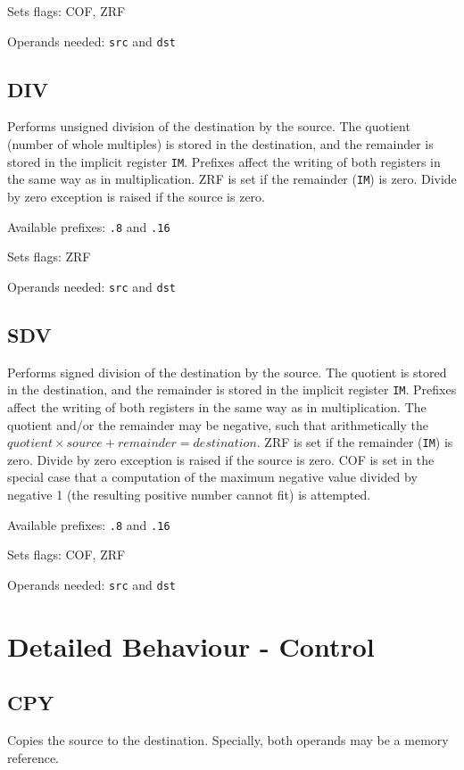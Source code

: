 \documentclass[12pt,a4paper]{report}
\begin{document}
Sets flags: COF, ZRF

Operands needed: \texttt{src} and \texttt{dst}

\subsection*{DIV}
Performs unsigned division of the destination by the source. The quotient (number of whole multiples) is stored in the destination, and the remainder is stored in the implicit register \texttt{IM}. Prefixes affect the writing of both registers in the same way as in multiplication. ZRF is set if the remainder (\texttt{IM}) is zero. Divide by zero exception is raised if the source is zero.

Available prefixes: \texttt{.8} and \texttt{.16}

Sets flags: ZRF

Operands needed: \texttt{src} and \texttt{dst}

\subsection*{SDV}
Performs signed division of the destination by the source. The quotient is stored in the destination, and the remainder is stored in the implicit register \texttt{IM}. Prefixes affect the writing of both registers in the same way as in multiplication. The quotient and/or the remainder may be negative, such that arithmetically the $quotient \times source + remainder = destination$. ZRF is set if the remainder (\texttt{IM}) is zero. Divide by zero exception is raised if the source is zero. COF is set in the special case that a computation of the maximum negative value divided by negative 1 (the resulting positive number cannot fit) is attempted.

Available prefixes: \texttt{.8} and \texttt{.16}

Sets flags: COF, ZRF

Operands needed: \texttt{src} and \texttt{dst}

\section{Detailed Behaviour - Control}

\subsection*{CPY}
Copies the source to the destination. Specially, both operands may be a memory reference.
\end{document}
